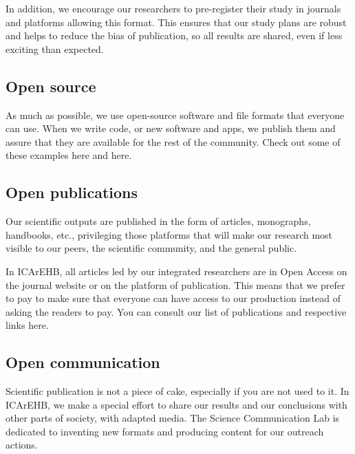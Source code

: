 \documentclass[
  letterpaper,
  DIV=11,
  numbers=noendperiod]{scrreprt}
\begin{document}
In addition, we encourage our researchers to pre-register their study in
journals and platforms allowing this format. This ensures that our study
plans are robust and helps to reduce the bias of publication, so all
results are shared, even if less exciting than expected.

\hypertarget{open-source}{%
\subsection*{Open source}\label{open-source}}

As much as possible, we use open-source software and file formats that
everyone can use. When we write code, or new software and apps, we
publish them and assure that they are available for the rest of the
community. Check out some of these examples here and here.

\hypertarget{open-publications}{%
\subsection*{Open publications}\label{open-publications}}

Our scientific outputs are published in the form of articles,
monographs, handbooks, etc., privileging those platforms that will make
our research most visible to our peers, the scientific community, and
the general public.

In ICArEHB, all articles led by our integrated researchers are in Open
Access on the journal website or on the platform of publication. This
means that we prefer to pay to make sure that everyone can have access
to our production instead of asking the readers to pay. You can consult
our list of publications and respective links here.~

\hypertarget{open-communication}{%
\subsection*{Open communication}\label{open-communication}}

Scientific publication is not a piece of cake, especially if you are not
used to it. In ICArEHB, we make a special effort to share our results
and our conclusions with other parts of society, with adapted media. The
Science Communication Lab is dedicated to inventing new formats and
producing content for our outreach actions.~
\end{document}
